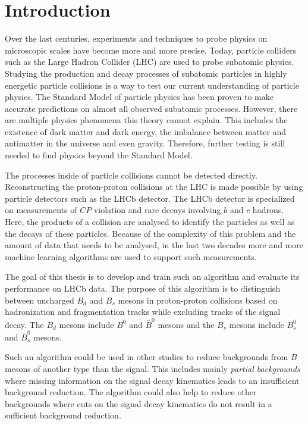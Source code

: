 \chapter{Introduction}

Over the last centuries, experiments and techniques to probe physics on microscopic scales have become more and more precise.
Today, particle colliders such as the Large Hadron Collider (LHC) are used to probe subatomic physics. %
Studying the production and decay processes of subatomic particles in highly energetic particle collisions is a way to test our current understanding of particle physics.
The Standard Model of particle physics has been proven to make accurate predictions on almost all observed subatomic processes.
However, there are multiple physics phenomena this theory cannot explain.
This includes the existence of dark matter and dark energy, the imbalance between matter and antimatter in the universe and even gravity.
Therefore, further testing is still needed to find physics beyond the Standard Model.

The processes inside of particle collisions cannot be detected directly.
Reconstructing the proton-proton collisions at the LHC is made possible by using particle detectors such as the LHCb detector.
The LHCb detector is specialized on measurements of $C\!P$ violation and rare decays involving $b$ and $c$ hadrons.
Here, the products of a collision are analysed to identify the particles as well as the decays of these particles.
Because of the complexity of this problem and the amount of data that needs to be analysed, in the last two decades more and more machine learning algorithms are used to support such measurements.

The goal of this thesis is to develop and train such an algorithm and evaluate its performance on LHCb data.
The purpose of this algorithm is to distinguish between uncharged $B_d$ and $B_s$ mesons in proton-proton collisions based on hadronization and fragmentation tracks while excluding tracks of the signal decay. The $B_d$ mesons include $B^0$ and $\bar{B}^0$ mesons and the $B_s$ mesons include $B_s^0$ and $\bar{B}_s^0$ mesons.

Such an algorithm could be used in other studies to reduce backgrounds from $B$ mesons of another type than the signal. %
This includes mainly \emph{partial backgrounds} where missing information on the signal decay kinematics leads to an insufficient background reduction.
The algorithm could also help to reduce other backgrounds where cuts on the signal decay kinematics do not result in a sufficient background reduction.






















